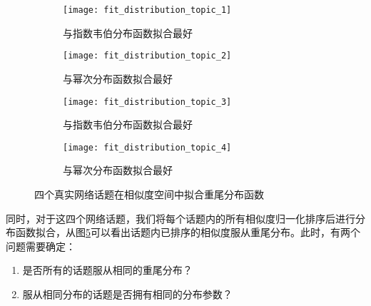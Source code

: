 \begin{figure}[!htbp]
    \centering
    \begin{subfigure}[b]{0.5\textwidth}
      \texttt{[image: fit\_distribution\_topic\_1]}
      \caption{与指数韦伯分布函数拟合最好}
      \label{fig:fitdistribution_t1}
    \end{subfigure}%
    \begin{subfigure}[b]{0.5\textwidth}
      \texttt{[image: fit\_distribution\_topic\_2]}
      \caption{与幂次分布函数拟合最好}
      \label{fig:fitdistribution_t2}
    \end{subfigure}
    \begin{subfigure}[b]{0.5\textwidth}
      \texttt{[image: fit\_distribution\_topic\_3]}
      \caption{与指数韦伯分布函数拟合最好}
      \label{fig:fitdistribution_t3}
    \end{subfigure}%
    \begin{subfigure}[b]{0.5\textwidth}
      \texttt{[image: fit\_distribution\_topic\_4]}
      \caption{与幂次分布函数拟合最好}
      \label{fig:fitdistribution_t4}
    \end{subfigure}
    \caption{四个真实网络话题在相似度空间中拟合重尾分布函数}
    \label{fig:fitdistribution}
\end{figure}
同时，对于这四个网络话题，我们将每个话题内的所有相似度归一化排序后进行分布函数拟合，从图\ref{fig:fitdistribution}可以看出话题内已排序的相似度服从重尾分布。此时，有两个问题需要确定：
\begin{enumerate}
\renewcommand{\labelenumi}{\theenumi)}
    \item 是否所有的话题服从相同的重尾分布？
    \item 服从相同分布的话题是否拥有相同的分布参数？
\end{enumerate}

